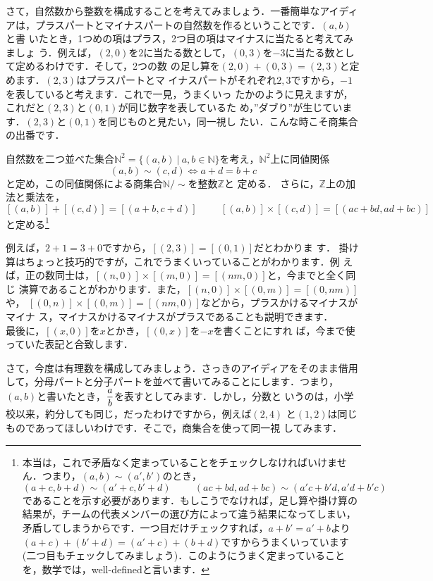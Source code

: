 
さて，自然数から整数を構成することを考えてみましょう．一番簡単なアイディ
アは，プラスパートとマイナスパートの自然数を作るということです．$(a,b)$と書
いたとき，1つめの項はプラス，2つ目の項はマイナスに当たると考えてみましょ
う．例えば，$(2,0)$を$2$に当たる数として，$(0,3)$を$-3$に当たる数として定めるわけです．そして，2つの数
の足し算を$(2,0)+(0,3)=(2,3)$と定めます．$(2,3)$はプラスパートとマ
イナスパートがそれぞれ$2,3$ですから，$-1$を表していると考えます．これで一見，うまくいっ
たかのように見えますが，これだと$(2,3)$と$(0,1)$が同じ数字を表しているた
め，”ダブり”が生じています．$(2,3)$と$(0,1)$を同じものと見たい，同一視し
たい．こんな時こそ商集合の出番です．


\begin{defi}[整数]
 自然数を二つ並べた集合$\mathbb{N}^2=\{(a,b)\ |\ a,b\in
\mathbb{N}\}$を考え，$\mathbb{N}^2$上に同値関係
\[
 (a,b)\sim(c,d)\Leftrightarrow a+d=b+c
\]
と定め，この同値関係による商集合$\mathbb{N}/\sim$を整数$\mathbb{Z}$と
 定める．
 さらに，$\mathbb{Z}$上の加法と乗法を，
 \[
  [(a,b)]+[(c,d)]=[(a+b,c+d)]\hspace{1cm}[(a,b)]\times[(c,d)]=[(ac+bd,ad+bc)]
 \]
 と定める\footnote{本当は，これで矛盾なく定まっていることをチェックしなければいけません．つまり，$(a,b)\sim(a',b')$のとき，\[(a+c,b+d)\sim(a'+c,b'+d)\hspace{1cm}(ac+bd,ad+bc)\sim(a'c+b'd,a'd+b'c)\]であることを示す必要があります．もしこうでなければ，足し算や掛け算の結果が，チームの代表メンバーの選び方によって違う結果になってしまい，矛盾してしまうからです．一つ目だけチェックすれば，$a+b'=a'+b$より$(a+c)+(b'+d)=(a'+c)+(b+d)$ですからうまくいっています(二つ目もチェックしてみましょう)．このようにうまく定まっていることを，数学では，well-definedと言います．}
\end{defi}

例えば，$2+1=3+0$ですから，$[(2,3)]=[(0,1)]$だとわかりま
す．
掛け算はちょっと技巧的ですが，これでうまくいっていることがわかります．例
えば，正の数同士は，$[(n,0)]\times[(m,0)]=[(nm,0)] $と，今までと全く同じ
演算であることがわかります．また，$[(n,0)]\times[(0,m)]=[(0,nm)]$や，
$[(0,n)]\times[(0,m)]=[(nm,0)]$などから，プラスかけるマイナスがマイナ
ス，マイナスかけるマイナスがプラスであることも説明できます．\\
最後に，$[(x,0)]$を$x$とかき，$[(0,x)]$を$-x$を書くことにすれ
ば，今まで使っていた表記と合致します．



さて，今度は有理数を構成してみましょう．さっきのアイディアをそのまま借用
して，分母パートと分子パートを並べて書いてみることにします．つまり，
$(a,b)$と書いたとき，$\displaystyle\frac{a}{b}$を表すとしてみます．しかし，分数と
いうのは，小学校以来，約分しても同じ，だったわけですから，例えば$(2,4)$
と$(1,2)$は同じものであってほしいわけです．そこで，商集合を使って同一視
してみます．

